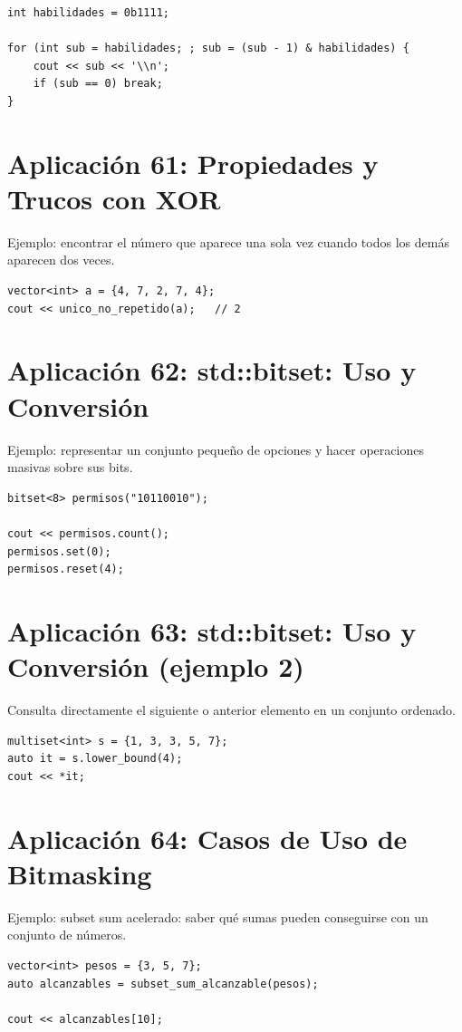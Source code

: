 \documentclass[10pt,twocolumn,letterpaper]{report}
\begin{document}
\begin{lstlisting}
int habilidades = 0b1111;

for (int sub = habilidades; ; sub = (sub - 1) & habilidades) {
    cout << sub << '\\n';
    if (sub == 0) break;
}
\end{lstlisting}

\section{Aplicación 61: Propiedades y Trucos con XOR}
Ejemplo: encontrar el número que aparece una sola vez cuando todos los demás aparecen dos veces.

\begin{lstlisting}
vector<int> a = {4, 7, 2, 7, 4};
cout << unico_no_repetido(a);   // 2
\end{lstlisting}

\section{Aplicación 62: std::bitset: Uso y Conversión}
Ejemplo: representar un conjunto pequeño de opciones y hacer operaciones masivas sobre sus bits.

\begin{lstlisting}
bitset<8> permisos("10110010");

cout << permisos.count();
permisos.set(0);
permisos.reset(4);
\end{lstlisting}

\section{Aplicación 63: std::bitset: Uso y Conversión (ejemplo 2)}
Consulta directamente el siguiente o anterior elemento en un conjunto ordenado.

\begin{lstlisting}
multiset<int> s = {1, 3, 3, 5, 7};
auto it = s.lower_bound(4);
cout << *it;
\end{lstlisting}

\section{Aplicación 64: Casos de Uso de Bitmasking}
Ejemplo: subset sum acelerado: saber qué sumas pueden conseguirse con un conjunto de números.

\begin{lstlisting}
vector<int> pesos = {3, 5, 7};
auto alcanzables = subset_sum_alcanzable(pesos);

cout << alcanzables[10];
\end{lstlisting}
\end{document}
